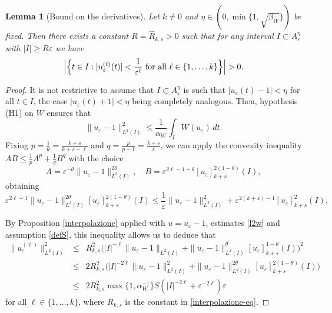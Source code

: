 \documentclass{article}
\newtheorem{lemma}{Lemma}%
\newcommand{\e}{\varepsilon}
\begin{document}
\begin{lemma}[Bound on the derivatives]\label{stimaintervallo} 
Let $k\neq 0$ and $\eta\in(0,\min\{1,\sqrt{\beta_W}\})$ be fixed. 
Then there exists a constant $R=\widehat R_{k,s}>0$ such that for any interval $I\subset A_\e^\eta$ with $|I|\geq R\e$ we have 
$$\Big|\Big\{t\in I: |u_\e^{(\ell)}(t)|<\frac{1}{\e^{\ell}} \ \hbox{\rm for all } \ell\in\{1,\dots, k\}\Big\}\Big|>0.$$
\end{lemma}
\begin{proof} 
It is not restrictive to assume that $I\subset A_\e^\eta$ is such that  $|u_\e(t)-1|<\eta$ for all $t\in I$, the case  $|u_\e(t)+1|<\eta$ being completely analogous. Then, hypothesis (H1) on $W$ ensures that 
\begin{equation}\label{l2w}
\|u_\e-1\|^2_{L^2(I)}\leq \frac{1}{\alpha_W}\int_I W(u_\e)\, dt. 
\end{equation}
Fixing  $p=\frac{1}{\theta}=\frac{k+s}{k+s-\ell}$ and $q=\frac{p}{p-1}=\frac{k+s}{\ell}$, we can apply the convexity inequality 
$AB\leq \frac{1}{p}A^p+\frac{1}{q}B^q$ with the choice 
$$A=\e^{-\theta} \|u_\e-1\|^{2\theta}_{L^2(I)}, \quad B=\e^{2\ell-1+\theta} [u_\e]_{k+s}^{2(1-\theta)}(I),$$ 
obtaining 
\begin{equation}\label{stconv}
\e^{2\ell-1}\|u_\e-1\|^{2\theta}_{L^2(I)}[u_\e]^{2(1-\theta)}_{k+s}(I)\leq \frac{1}{\e}\|u_\e-1\|^2_{L^2(I)}+\e^{2(k+s)-1}[u_\e]^2_{k+s}(I).
\end{equation} 

By Proposition \ref{interpolazione} applied with $u=u_\e-1$, estimates \eqref{l2w} and assumption \eqref{defS}, this inequality allows us to deduce that 
\begin{eqnarray}\label{interpolationue}\nonumber
\|u_\e^{(\ell)}\|^2_{L^2(I)}&\leq &
R_{k,s}^2\Big(|I|^{-\ell}\|u_\e-1\|_{L^2(I)}+\|u_\e-1\|^\theta_{L^2(I)}[u_\e]^{1-\theta}_{k+s} (I)\Big)^2 
\\ \nonumber
&\leq &
2R_{k,s}^2\Big(|I|^{-2\ell}\|u_\e-1\|^2_{L^2(I)}+\|u_\e-1\|^{2\theta}_{L^2(I)}[u_\e]^{2(1-\theta)}_{k+s}(I) \Big) 
\\
&\le &2R^2_{k,s} \max\{1,\alpha_W^{-1}\} S (|I|^{-2\ell}+
\e^{-2\ell}) \e 
\end{eqnarray}
for all $\ell\in\{1,\dots, k\}$, where $R_{k,s}$ is the constant in \eqref{interpolazione-eq}. 


\end{proof}
\end{document}
